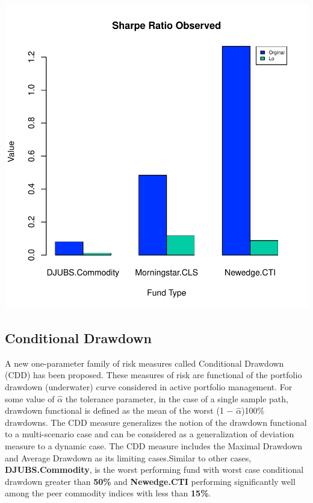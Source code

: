 \documentclass[12pt,letterpaper,english]{article}
\begin{document}
\includegraphics{Commodity-006}
\subsection{Conditional Drawdown}
A new one-parameter family of risk measures called Conditional Drawdown (CDD) has
been proposed. These measures of risk are functional of the portfolio drawdown (underwater) curve considered in active portfolio management. For some value of $\hat{\alpha}$ the tolerance parameter, in the case of a single sample path, drawdown functional is defined as the mean of the worst (1 \(-\) $\hat{\alpha}$)100\% drawdowns. The CDD measure generalizes the notion of the drawdown functional to a multi-scenario case and can be considered as a generalization of deviation measure to a dynamic case. The CDD measure includes the Maximal Drawdown and Average Drawdown as its limiting cases.Similar to other cases, \textbf{DJUBS.Commodity}, is the worst performing fund with worst case conditional drawdown greater than \textbf{50\%} and \textbf{Newedge.CTI} performing significantly well among the peer commodity indices with less than \textbf{15\%}.
\end{document}
